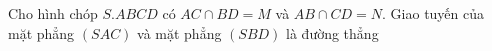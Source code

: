 \begin{ex}
Cho hình chóp $S.ABCD$ có $AC\cap BD=M$ và $AB\cap CD=N$. Giao tuyến của mặt phẳng $(SAC)$ và mặt phẳng $(SBD)$ là đường thẳng
\end{ex}
